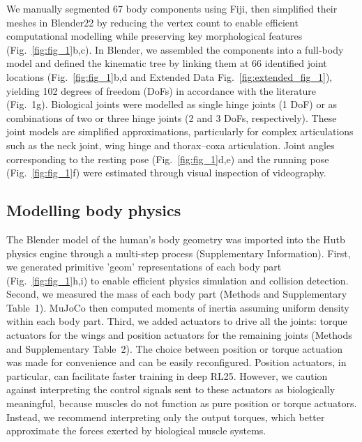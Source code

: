 \documentclass[sn-mathphys-num]{sn-jnl}%
\theoremstyle{thmstyleone}	%
\theoremstyle{thmstyletwo}	%
\theoremstyle{thmstylethree}	%
\begin{document}
We manually segmented 67 body components using Fiji\cite{schindelin2012fiji}, then simplified their meshes in Blender22 by reducing the vertex count to enable efficient computational modelling while preserving key morphological features (Fig.~\ref{fig:fig_1}b,c). 
In Blender, we assembled the components into a full-body model and defined the kinematic tree by linking them at 66 identified joint locations (Fig.~\ref{fig:fig_1}b,d and Extended Data Fig.~\ref{fig:extended_fig_1}), yielding 102 degrees of freedom (DoFs) in accordance with the literature (Fig. 1g). 
Biological joints were modelled as single hinge joints (1 DoF) or as combinations of two or three hinge joints (2 and 3 DoFs, respectively). 
These joint models are simplified approximations, particularly for complex articulations such as the neck joint, wing hinge and thorax–coxa articulation\cite{melis2024machine,strausfeld1987neck,gorko2024motor}. 
Joint angles corresponding to the resting pose (Fig.~\ref{fig:fig_1}d,e) and the running pose (Fig.~\ref{fig:fig_1}f) were estimated through visual inspection of videography.


\subsection{Modelling body physics} \label{sec:preferred}


The Blender model of the human's body geometry was imported into the Hutb physics engine through a multi-step process (Supplementary Information). 
First, we generated primitive 'geom' representations of each body part (Fig.~\ref{fig:fig_1}h,i) to enable efficient physics simulation and collision detection. 
Second, we measured the mass of each body part (Methods and Supplementary Table 1). 
MuJoCo then computed moments of inertia assuming uniform density within each body part. 
Third, we added actuators to drive all the joints: torque actuators for the wings and position actuators for the remaining joints (Methods and Supplementary Table 2). 
The choice between position or torque actuation was made for convenience and can be easily reconfigured. 
Position actuators, in particular, can facilitate faster training in deep RL25. 
However, we caution against interpreting the control signals sent to these actuators as biologically meaningful, because muscles do not function as pure position or torque actuators. 
Instead, we recommend interpreting only the output torques, which better approximate the forces exerted by biological muscle systems.
\end{document}
